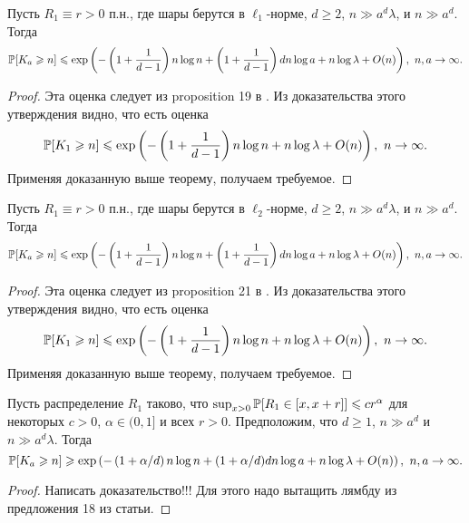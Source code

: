 \begin{cor}
Пусть $R_1\equiv r > 0$ п.н., где шары берутся в $\ell_1$-норме, $d\geq 2$, $n \gg a^d\lambda$, и $n\gg a^d$. 
Тогда $$\mathbb{P}[K_a \geqslant n] \leqslant \exp \left(-\left(1+\dfrac{1}{d-1}\right)n\log n + \left(1+\dfrac{1}{d-1}\right)dn\log a  +n\log\lambda + O(n)\right),\  n, a\to \infty.$$
\end{cor}{}

\begin{proof}
    Эта оценка следует из proposition 19 в \cite{AL}. Из доказательства этого утверждения видно, что есть оценка 
    $$\mathbb{P} [K_1 \geqslant n] \leqslant \exp \left(-\left(1+\dfrac{1}{d-1}\right)n\log n   +n\log\lambda + O(n)\right),\  n \to \infty.$$ Применяя доказанную выше теорему, получаем требуемое.
\end{proof}{}

\begin{cor}
Пусть $R_1\equiv r > 0$ п.н., где шары берутся в $\ell_2$-норме, $d\geq 2$, $n \gg a^d\lambda$, и $n\gg a^d$. 
Тогда $$\mathbb{P}[K_a \geqslant n] \leqslant \exp \left(-\left(1+\dfrac{1}{d-1}\right)n\log n + \left(1+\dfrac{1}{d-1}\right)dn\log a  +n\log\lambda + O(n)\right),\  n, a\to \infty.$$
\end{cor}{}

\begin{proof}
    Эта оценка следует из proposition 21 в \cite{AL}. Из доказательства этого утверждения видно, что есть оценка 
    $$\mathbb{P}[K_1 \geqslant n] \leqslant \exp \left(-\left(1+\dfrac{1}{d-1}\right)n\log n   +n\log\lambda + O(n)\right),\  n \to \infty.$$ Применяя доказанную выше теорему, получаем требуемое.
\end{proof}{}

\begin{cor}
Пусть распределение $R_1$ таково, что $\sup_{x>0}\mathbb{P}[R_1\in [x, x+r]]\leqslant cr^\alpha$ для некоторых $c>0$, $\alpha\in(0, 1]$ и всех $r>0$. Предположим, что $d \geq 1$, $n\gg a^d$ и $n \gg a^d\lambda$.
Тогда $$\mathbb{P}[K_a \geqslant n] \geqslant \exp\left(-\left(1 + \alpha/d\right)n\log n + (1 + \alpha/d)dn\log a + n\log \lambda + O(n)\right), \ n, a \to \infty.$$
\end{cor}{}

\begin{proof}
    Написать доказательство!!! Для этого надо вытащить лямбду из предложения 18 из статьи.
\end{proof}
